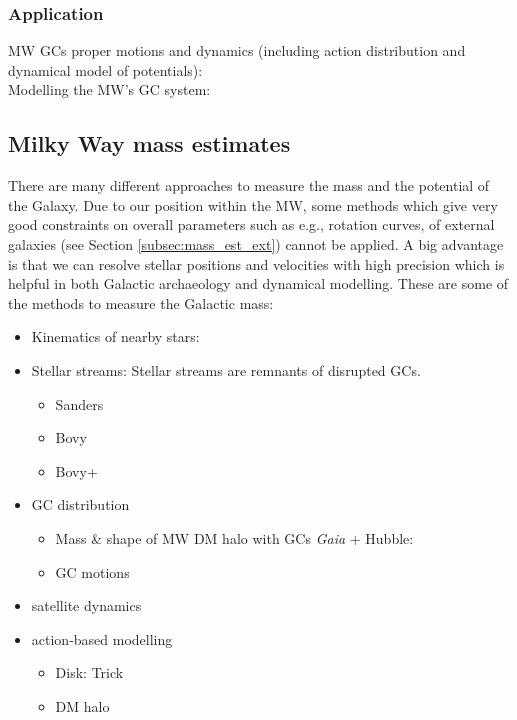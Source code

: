 \subsubsection{Application}
MW \acp{GC} proper motions and dynamics (including action distribution and dynamical model of potentials): \cite{Vasiliev...GCdynsGaiaDR2...2018}\\
Modelling the \ac{MW}'s \ac{GC} system: \cite{Binney...GCsystem...2017}



\subsection{Milky Way mass estimates}\label{subsec:mass_est_MW}
There are many different approaches to measure the mass and the potential of the Galaxy. Due to our position within the \ac{MW}, some methods which give very good constraints on overall parameters such as e.g., rotation curves, of external galaxies (see Section \ref{subsec:mass_est_ext}) cannot be applied. A big advantage is that we can resolve stellar positions and velocities with high precision which is helpful in both Galactic archaeology and dynamical modelling. These are some of the methods to measure the Galactic mass:
\begin{itemize}
    \item Kinematics of nearby stars: \cite{Kuijken...LocalDMdens...1989, Bovy...LocalDMdens...2012}
    \item Stellar streams: Stellar streams are remnants of disrupted \acp{GC}. 
    \begin{itemize}
        \item Sanders \citep{Streams...Sanders...2014}
        \item Bovy \citep{Streams...Bovy...2014}
        \item Bovy+ \citep{Streams..GD1..Pal5...Bovy...2016}
    \end{itemize}
    \item \ac{GC} distribution 
    \begin{itemize}
        \item Mass \& shape of \ac{MW} \ac{DM} halo with \acp{GC} \textit{Gaia} + Hubble: \cite{Posti...MWmassGCs...2018}
        \item GC motions \citep{MWmass...GCmotions...Watkins...2018}
    \end{itemize}
    \item satellite dynamics \citep{MWmass...sat...dyn}
    \item action-based modelling
    \begin{itemize}
        \item Disk: Trick \citep{Wilmathesis}
        \item DM halo \citep{Sanderson...gravpotstreams...2017} 
    \end{itemize}
    
\end{itemize}



